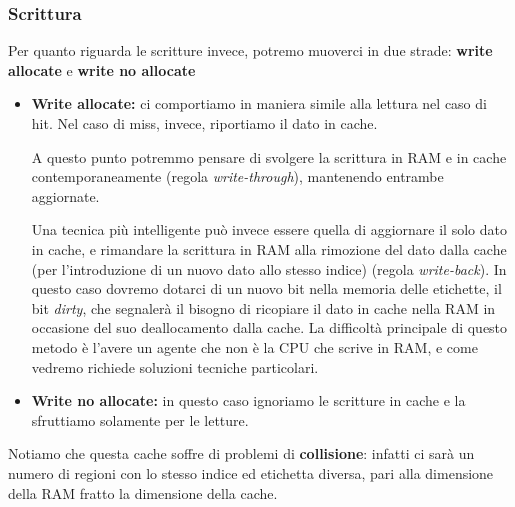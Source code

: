 \documentclass[a4paper,11pt]{article}
\begin{document}
\subsubsection{Scrittura}
Per quanto riguarda le scritture invece, potremo muoverci in due strade: \textbf{write allocate} e \textbf{write no allocate}

\begin{itemize}
	\item \textbf{Write allocate:}
ci comportiamo in maniera simile alla lettura nel caso di hit.
Nel caso di miss, invece, riportiamo il dato in cache.

A questo punto potremmo pensare di svolgere la scrittura in RAM e in cache contemporaneamente (regola \textit{write-through}), mantenendo entrambe aggiornate.

Una tecnica più intelligente può invece essere quella di aggiornare il solo dato in cache, e rimandare la scrittura in RAM alla rimozione del dato dalla cache (per l'introduzione di un nuovo dato allo stesso indice) (regola \textit{write-back}).
In questo caso dovremo dotarci di un nuovo bit nella memoria delle etichette, il bit \textit{dirty}, che segnalerà il bisogno di ricopiare il dato in cache nella RAM in occasione del suo deallocamento dalla cache.
La difficoltà principale di questo metodo è l'avere un agente che non è la CPU che scrive in RAM, e come vedremo richiede soluzioni tecniche particolari.

\item \textbf{Write no allocate:}
in questo caso ignoriamo le scritture in cache e la sfruttiamo solamente per le letture.

\end{itemize}

\par\smallskip

Notiamo che questa cache soffre di problemi di \textbf{collisione}: infatti ci sarà un numero di regioni con lo stesso indice ed etichetta diversa, pari alla dimensione della RAM fratto la dimensione della cache.
\end{document}
